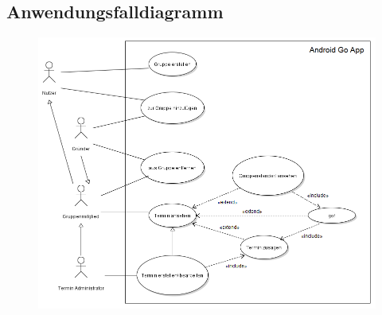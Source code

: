 \documentclass{scrartcl}
\begin{document}
	\subsection{Anwendungsfalldiagramm}
	\begin{figure}[h]
	\includegraphics[width=\textwidth]{goApp_useCase}
	\end{figure}

	\newpage
	

	
	
\end{document}
